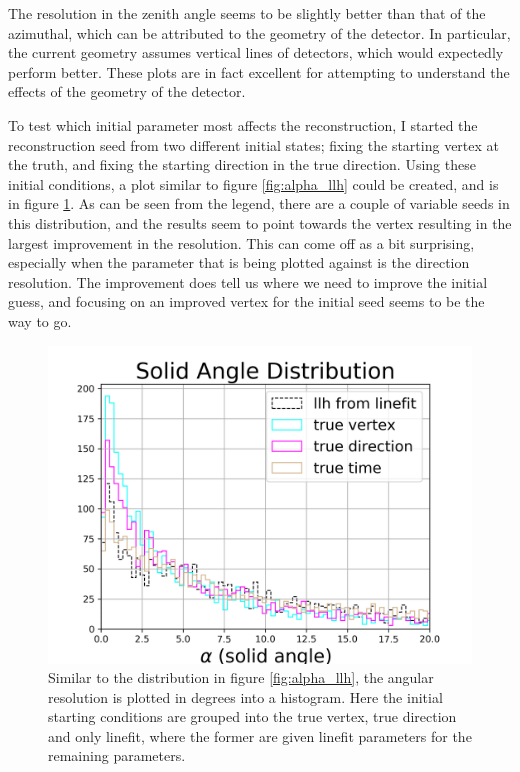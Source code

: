 The resolution in the zenith angle seems to be slightly better than that of the azimuthal, which can be attributed to the geometry of the detector. In particular, the current geometry assumes vertical lines of detectors, which would expectedly perform better. These plots are in fact excellent for attempting to understand the effects of the geometry of the detector.

To test which initial parameter most affects the reconstruction, I started the reconstruction seed from two different initial states; fixing the starting vertex at the truth, and fixing the starting direction in the true direction. Using these initial conditions, a plot similar to figure \ref{fig:alpha_llh} could be created, and is in figure \ref{fig:alpha_llh_test}. As can be seen from the legend, there are a couple of variable seeds in this distribution, and the results seem to point towards the vertex resulting in the largest improvement in the resolution. This can come off as a bit surprising, especially when the parameter that is being plotted against is the direction resolution. The improvement does tell us where we need to improve the initial guess, and focusing on an improved vertex for the initial seed seems to be the way to go.

\begin{figure}[H]
  \centering
  \includegraphics[width=12cm]{./Figures/reco_plots/alpha_dist_llh_seedcomparison.png}
  \caption{Similar to the distribution in figure \ref{fig:alpha_llh}, the angular resolution is plotted in degrees into a histogram. Here the initial starting conditions are grouped into the true vertex, true direction and only linefit, where the former are given linefit parameters for the remaining parameters.}
  \label{fig:alpha_llh_test}
\end{figure}

